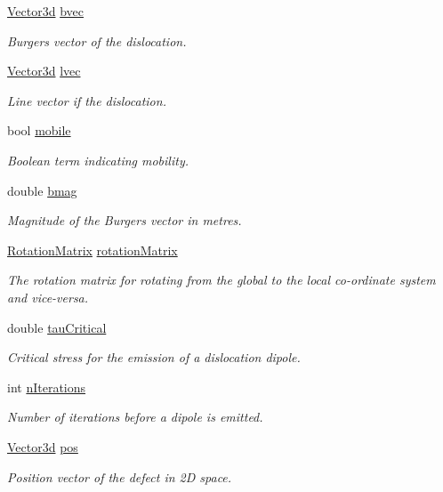 \begin{DoxyCompactItemize}
\item 
\hyperlink{classVector3d}{Vector3d} \hyperlink{classDislocationSource_ade4753ac6106317c693c2bba4f83a568}{bvec}
\begin{DoxyCompactList}\small\item\em Burgers vector of the dislocation. \end{DoxyCompactList}\item 
\hyperlink{classVector3d}{Vector3d} \hyperlink{classDislocationSource_a6a1ab6dc549236d2335a200e601781ea}{lvec}
\begin{DoxyCompactList}\small\item\em Line vector if the dislocation. \end{DoxyCompactList}\item 
bool \hyperlink{classDislocationSource_a7cfb4fd64ac4da8c79398b6e2c732875}{mobile}
\begin{DoxyCompactList}\small\item\em Boolean term indicating mobility. \end{DoxyCompactList}\item 
double \hyperlink{classDislocationSource_a59c95f3cb5af5180d2c42792413f7816}{bmag}
\begin{DoxyCompactList}\small\item\em Magnitude of the Burgers vector in metres. \end{DoxyCompactList}\item 
\hyperlink{classRotationMatrix}{Rotation\-Matrix} \hyperlink{classDislocationSource_a3bb826a0646d5c5546045cbf8d523b4f}{rotation\-Matrix}
\begin{DoxyCompactList}\small\item\em The rotation matrix for rotating from the global to the local co-\/ordinate system and vice-\/versa. \end{DoxyCompactList}\item 
double \hyperlink{classDislocationSource_ad91294a3ab5b6f6156a2ad67b9df954e}{tau\-Critical}
\begin{DoxyCompactList}\small\item\em Critical stress for the emission of a dislocation dipole. \end{DoxyCompactList}\item 
int \hyperlink{classDislocationSource_aacf42c7505f28b50280b23b435024e17}{n\-Iterations}
\begin{DoxyCompactList}\small\item\em Number of iterations before a dipole is emitted. \end{DoxyCompactList}\item 
\hyperlink{classVector3d}{Vector3d} \hyperlink{classDefect_aed2731c1beefc22e3db6ad5b18194cdd}{pos}
\begin{DoxyCompactList}\small\item\em Position vector of the defect in 2\-D space. \end{DoxyCompactList}\end{DoxyCompactItemize}


